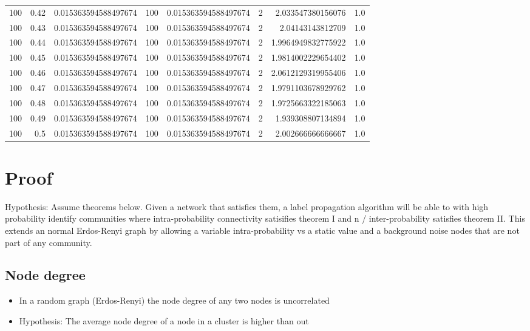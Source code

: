 \documentclass[11pt]{article}
\begin{document}
\begin{center}
\begin{tabular}{rrrrrrrr}
100 & 0.42 & 0.015363594588497674 & 100 & 0.015363594588497674 & 2 & 2.033547380156076 & 1.0\\
100 & 0.43 & 0.015363594588497674 & 100 & 0.015363594588497674 & 2 & 2.04143143812709 & 1.0\\
100 & 0.44 & 0.015363594588497674 & 100 & 0.015363594588497674 & 2 & 1.9964949832775922 & 1.0\\
100 & 0.45 & 0.015363594588497674 & 100 & 0.015363594588497674 & 2 & 1.9814002229654402 & 1.0\\
100 & 0.46 & 0.015363594588497674 & 100 & 0.015363594588497674 & 2 & 2.0612129319955406 & 1.0\\
100 & 0.47 & 0.015363594588497674 & 100 & 0.015363594588497674 & 2 & 1.9791103678929762 & 1.0\\
100 & 0.48 & 0.015363594588497674 & 100 & 0.015363594588497674 & 2 & 1.9725663322185063 & 1.0\\
100 & 0.49 & 0.015363594588497674 & 100 & 0.015363594588497674 & 2 & 1.939308807134894 & 1.0\\
100 & 0.5 & 0.015363594588497674 & 100 & 0.015363594588497674 & 2 & 2.002666666666667 & 1.0\\
\hline
\end{tabular}
\end{center}

\section{Proof}
\label{sec:org51cc7e6}

Hypothesis: Assume theorems below. Given a network that satisfies them, a label propagation
algorithm will be able to with high probability identify communities where intra-probability 
connectivity satisifies theorem I and n / inter-probability satisfies theorem II. This extends
an normal Erdos-Renyi graph by allowing a variable intra-probability vs a static value and a
background noise nodes that are not part of any community.

\subsection{Node degree}
\label{sec:org702c61d}

\begin{itemize}
\item In a random graph (Erdos-Renyi) the node degree of any two nodes is uncorrelated
\item Hypothesis: The average node degree of a node in a cluster is higher than out
\end{itemize}
\end{document}
